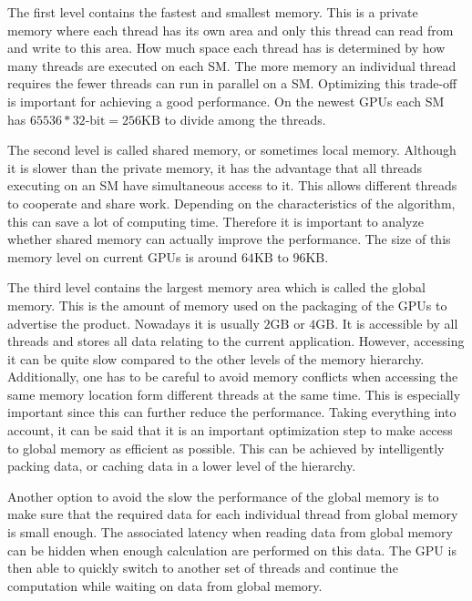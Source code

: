 The first level contains the fastest and smallest memory. This is a private memory where each thread has its own area and only this thread can read from and write to this area. How much space each thread has is determined by how many threads are executed on each SM. The more memory an individual thread requires the fewer threads can run in parallel on a SM. Optimizing this trade-off is important for achieving a good performance. On the newest GPUs each SM has $65536 * 32\text{-bit} = 256\text{KB}$ to divide among the threads.

The second level is called shared memory, or sometimes local memory. Although it is slower than the private memory, it has the advantage that all threads executing on an SM have simultaneous access to it. This allows different threads to cooperate and share work. Depending on the characteristics of the algorithm, this can save a lot of computing time. Therefore it is important to analyze whether shared memory can actually improve the performance. The size of this memory level on current GPUs is around $64\text{KB}$ to $96\text{KB}$.

The third level contains the largest memory area which is called the global memory. This is the amount of memory used  on the packaging of the GPUs to advertise the product. Nowadays it is usually $2\text{GB}$ or $4\text{GB}$. It is accessible by all threads and stores all data relating to the current application. However, accessing it can be quite slow compared to the other levels of the memory hierarchy. Additionally, one has to be careful to avoid memory conflicts when accessing the same memory location form different threads at the same time. This is especially important since this can further reduce the performance. Taking everything into account, it can be said that it is an important optimization step to make access to global memory as efficient as possible. This can be achieved by intelligently packing data, or caching data in a lower level of the hierarchy. 

Another option to avoid the slow the performance of the global memory is to make sure that the required data for each individual thread from global memory is small enough. The associated latency when reading data from global memory can be hidden when enough calculation are performed on this data. The GPU is then able to quickly switch to another set of threads and continue the computation while waiting on data from global memory.

